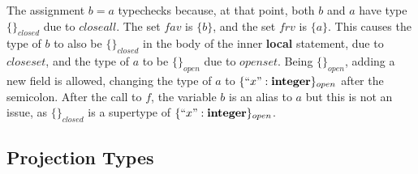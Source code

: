 \documentclass[preprint]{sigplanconf}
\newcommand{\Integer}{\mathbf{integer}}
\begin{document}
The assignment $b=a$ typechecks because, at that point, 
both $b$ and $a$ have type $\{\}_{closed}$ due to $closeall$.
The set $fav$ is $\{b\}$, and the set $frv$ is $\{a\}$.
This causes the type of $b$ to also be $\{\}_{closed}$
in the body of the inner {\bf local} statement, due to $closeset$, and the type of $a$ to be $\{\}_{open}$ due
to $openset$. Being $\{\}_{open}$, adding a new field
is allowed, changing the type of $a$ to $\{``x": \Integer\}_{open}$ after the semicolon. After the call to
$f$, the variable $b$ is an alias to $a$ but this is not
an issue, as $\{\}_{closed}$ is a supertype of $\{``x": \Integer\}_{open}$.

\subsection{Projection Types}
\label{sec:projections}
\end{document}
